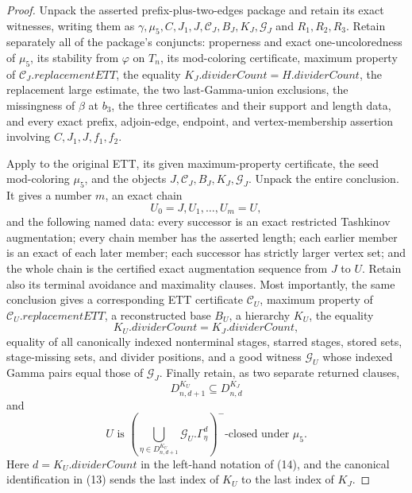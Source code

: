 \begin{proof}
Unpack the asserted prefix-plus-two-edges package and retain its exact
witnesses, writing them as
$\gamma,\mu_5,C,J_1,J,\mathcal C_J,B_J,K_J,\mathcal G_J$ and
$R_1,R_2,R_3$.  Retain separately all of the package's conjuncts:
properness and exact one-uncoloredness of $\mu_5$, its stability from
$\varphi$ on $T_n$, its mod-coloring certificate, maximum property of
$\mathcal C_J.\mathit{replacementETT}$, the equality
$K_J.\mathit{dividerCount}=H.\mathit{dividerCount}$, the replacement
large estimate, the two last-Gamma-union exclusions, the missingness of
$\beta$ at $b_3$, the three  certificates and their
support and length data, and every exact prefix, adjoin-edge, endpoint,
and vertex-membership assertion involving $C,J_1,J,f_1,f_2$.

Apply  to the original ETT,
its given maximum-property certificate, the seed mod-coloring $\mu_5$,
and the objects $J,\mathcal C_J,B_J,K_J,\mathcal G_J$.  Unpack the entire
conclusion.  It gives a number $m$, an exact chain
\[
                         U_0=J,U_1,\ldots,U_m=U,               \tag{12}
\]
and the following named data: every successor is an exact restricted
Tashkinov augmentation; every chain member has the asserted length; each
earlier member is an exact  of each
later member; each successor has strictly larger vertex set; and the
whole chain is the certified exact augmentation sequence from $J$ to $U$.
Retain also its terminal avoidance and maximality clauses.  Most
importantly, the same conclusion gives a corresponding ETT certificate
$\mathcal C_U$, maximum property of
$\mathcal C_U.\mathit{replacementETT}$, a reconstructed base $B_U$, a
hierarchy $K_U$, the equality
\[
 K_U.\mathit{dividerCount}=K_J.\mathit{dividerCount},          \tag{13}
\]
equality of all canonically indexed nonterminal stages, starred stages,
stored sets, stage-missing sets, and divider positions, and a good witness
$\mathcal G_U$ whose indexed Gamma pairs equal those of $\mathcal G_J$.
Finally retain, as two separate returned clauses,
\[
 D^{K_U}_{n,d+1}\subseteq D^{K_J}_{n,d}                       \tag{14}
\]
and
\[
 U\text{ is }
 \left(\bigcup_{\eta\in D^{K_U}_{n,d+1}}
       \mathcal G_U.\Gamma^d_\eta\right)^-
 \text{-closed under }\mu_5.                                  \tag{15}
\]
Here $d=K_U.\mathit{dividerCount}$ in the left-hand notation of (14),
and the canonical identification in (13) sends the last index of $K_U$
to the last index of $K_J$.


\end{proof}
